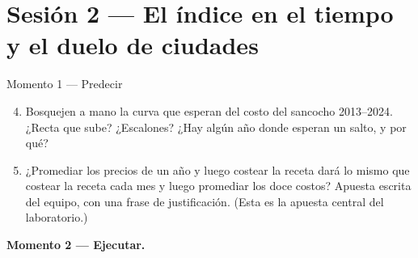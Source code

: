\documentclass[12pt,letterpaper]{article}
\begin{document}
\section{Sesión 2 --- El índice en el tiempo y el duelo de ciudades}

\begin{cajaprediccion}{Momento 1 --- Predecir}
\begin{enumerate}[label=P\arabic*., itemsep=0.1em]
    \setcounter{enumi}{3}
    \item Bosquejen a mano la curva que esperan del costo del sancocho 2013--2024. ¿Recta que sube? ¿Escalones? ¿Hay algún año donde esperan un salto, y por qué?
    \item ¿Promediar los precios de un año y luego costear la receta dará lo mismo que costear la receta cada mes y luego promediar los doce costos? Apuesta escrita del equipo, con una frase de justificación. (Esta es la apuesta central del laboratorio.)
\end{enumerate}
\end{cajaprediccion}

\textbf{Momento 2 --- Ejecutar.}
\end{document}
